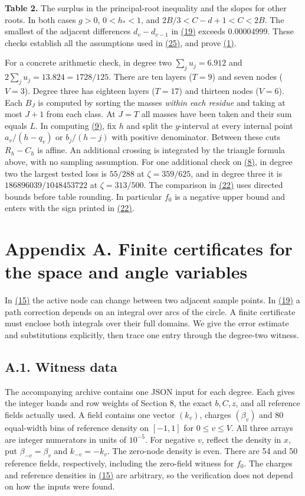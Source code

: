 \documentclass[11pt,a4paper]{article}
\begin{document}
\textbf{Table 2.} The surplus in the principal-root inequality and the slopes for other roots. In both cases \(g>0\), \(0<h_*<1\), and \(2B/3<C-d+1<C<2B\). The smallest of the adjacent differences \(d_v-d_{v-1}\) in \hyperref[eq:19]{(19)} exceeds \(0.00004999\). These checks establish all the assumptions used in \hyperref[eq:25]{(25)}, and prove \hyperref[eq:1]{(1)}.

For a concrete arithmetic check, in degree two \(\sum_j u_j=6.912\) and \(2\sum_j u_j=13.824=1728/125\). There are ten layers (\(T=9\)) and seven nodes (\(V=3\)). Degree three has eighteen layers (\(T=17\)) and thirteen nodes (\(V=6\)). Each \(B_J\) is computed by sorting the masses \emph{within each residue} and taking at most \(J+1\) from each class. At \(J=T\) all masses have been taken and their sum equals \(L\). In computing \hyperref[eq:9]{(9)}, fix \(h\) and split the \(y\)-interval at every internal point \(a_v/(h-q_v)\) or \(b_j/(h-j)\) with positive denominator. Between these cuts \(R_h-C_h\) is affine. An additional crossing is integrated by the triangle formula above, with no sampling assumption. For one additional check on \hyperref[eq:8]{(8)}, in degree two the largest tested loss is \(55/288\) at \(\zeta=359/625\), and in degree three it is \(186896039/1048453722\) at \(\zeta=313/500\). The comparison in \hyperref[eq:22]{(22)} uses directed bounds before table rounding. In particular \(f_0\) is a negative upper bound and enters with the sign printed in \hyperref[eq:22]{(22)}.

\section{Appendix A. Finite certificates for the space and angle variables}\label{appendix-a.-finite-certificates-for-the-space-and-angle-variables}

In \hyperref[eq:15]{(15)} the active node can change between two adjacent sample points. In \hyperref[eq:19]{(19)} a path correction depends on an integral over arcs of the circle. A finite certificate must enclose both integrals over their full domains. We give the error estimate and substitutions explicitly, then trace one entry through the degree-two witness.

\subsection{A.1. Witness data}\label{a.1.-witness-data}

The accompanying archive contains one JSON input for each degree. Each gives the integer bands and row weights of Section 8, the exact \(b,C,z\), and all reference fields actually used. A field contains one vector \((k_v)\), charges \((\beta_v)\) and 80 equal-width bins of reference density on \([-1,1]\) for \(0\le v\le V\). All three arrays are integer numerators in units of \(10^{-5}\). For negative \(v\), reflect the density in \(x\), put \(\beta_{-v}=\beta_v\) and \(k_{-v}=-k_v\). The zero-node density is even. There are 54 and 50 reference fields, respectively, including the zero-field witness for \(f_0\). The charges and reference densities in \hyperref[eq:15]{(15)} are arbitrary, so the verification does not depend on how the inputs were found.
\end{document}
